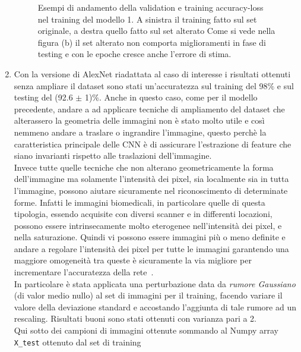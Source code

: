 \begin{enumerate}
\begin{figure}[H]
\begin{subfigure}{0.5\textwidth}
          \caption{}
          \label{fig:snap2}
        \end{subfigure}%
        \caption{Esempi di andamento della validation e training accuracy-loss nel training del modello 1. A sinistra il training fatto sul set originale, a destra quello fatto sul set alterato 
        Come si vede nella figura (b) il set alterato non comporta miglioramenti in fase di testing e con le epoche cresce anche l'errore di stima.}
        \label{fig:fig}
\end{figure} 

       
      
    \item Con la versione di AlexNet riadattata al caso di interesse i risultati ottenuti senza ampliare il dataset
    sono stati un'accuratezza sul training del 98$\%$ e sul testing del (92.6 $\pm$ 1)$\%$. 
    Anche in questo caso, come per il modello precedente, andare a ad applicare tecniche di ampliamento del dataset
    che alterassero la geometria delle immagini non è stato molto utile e così nemmeno andare a traslare o ingrandire l'immagine, 
    questo perchè la caratteristica principale delle CNN è di assicurare l'estrazione di feature che siano invarianti 
    rispetto alle traslazioni dell'immagine. \\ 
    Invece tutte quelle tecniche che non alterano geometricamente la forma dell'immagine ma solamente l'intensità dei pixel,
    sia localmente sia in tutta l'immagine, possono aiutare sicuramente nel riconoscimento di determinate forme. 
    Infatti le immagini biomedicali, in particolare quelle di questa tipologia, essendo acquisite con diversi 
    scanner e in differenti locazioni, possono essere intrinsecamente molto eterogenee nell'intensità dei pixel,
     e nella saturazione. 
    Quindi vi possono essere immagini più o meno definite e andare a regolare l'intensità dei pixel
     per tutte le immagini garantendo una 
    maggiore omogeneità tra queste è sicuramente la via migliore per incrementare
     l'accuratezza della rete~\cite{gaussnoise}.\\
    In particolare è stata applicata una perturbazione data da \emph{rumore Gaussiano}
    (di valor medio nullo) al set di
     immagini per il training, facendo variare il valore della
    deviazione standard  e accostando l'aggiunta di tale rumore ad un rescaling. Risultati buoni sono stati ottenuti con varianza pari a 2. \\
    Qui sotto dei campioni di immagini ottenute sommando al Numpy array \lstinline{X_test} ottenuto dal set di training

\end{enumerate}
